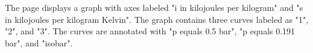 The page displays a graph with axes labeled "i in kilojoules per kilogram" and "s in kilojoules per kilogram Kelvin". The graph contains three curves labeled as "1", "2", and "3". The curves are annotated with "p equals 0.5 bar", "p equals 0.191 bar", and "isobar".